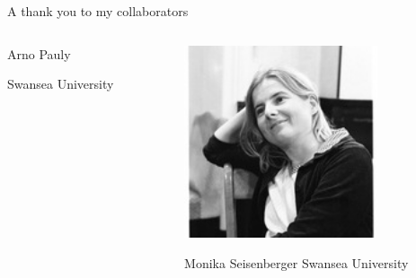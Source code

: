 \documentclass[smaller]{beamer}
\begin{document}
\begin{frame}[label={sec:orgda7c189}]{A thank you to my collaborators}
\begin{columns}
\begin{column}{0.3\columnwidth}
\begin{center}
Arno Pauly

Swansea University
\end{center}
\end{column}

\begin{column}{0.3\columnwidth}
\begin{center}
\includegraphics[width=0.7\textwidth]{images/Monika-Seisenberger.jpg}
\end{center}

\begin{center}
Monika Seisenberger
Swansea University
\end{center}
\end{column}
\end{columns}
\end{frame}
\end{document}
